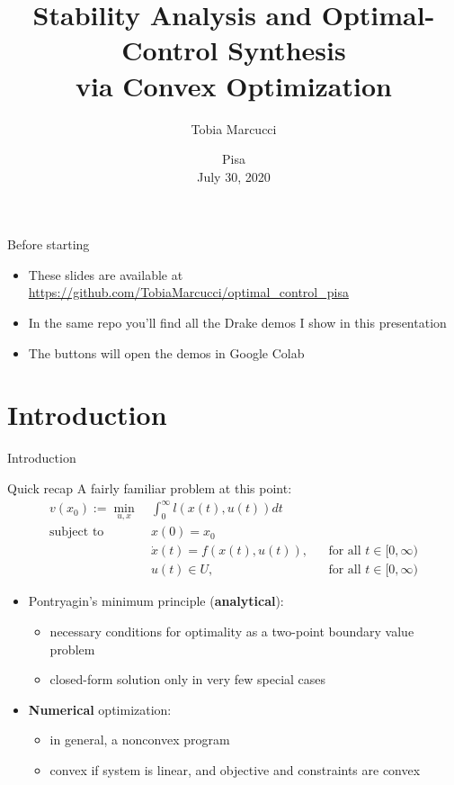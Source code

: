 \documentclass[aspectratio=169]{beamer}
\title[Stability and Control Synthesis via Convex Optimization]{Stability Analysis and Optimal-Control Synthesis \\ via Convex Optimization}
\author{Tobia Marcucci}
\institute{\textit{tobiam@mit.edu}}
\date{Pisa \\ July 30, 2020}
\begin{document}
\begin{frame}
\titlepage
\end{frame}

\begin{frame}{Before starting}
\begin{itemize}
\item
These slides are available at \href{https://github.com/TobiaMarcucci/optimal_control_pisa}{{\color{blue}https://github.com/TobiaMarcucci/optimal\_control\_pisa}}
\item
In the same repo you'll find all the Drake demos I show in this presentation
\item
The buttons  will open the demos in Google Colab
\end{itemize}
\end{frame}

\section{Introduction}
\begin{frame}
\huge
\centering
{\color{darkred} Introduction}
\end{frame}

\begin{frame}{Quick recap}
A fairly familiar problem at this point:
\begin{align*}
v(x_0) := \min_{u, x} \ &\int_0^\infty l(x(t), u(t)) dt \\
\text{subject to} \ & x(0) = x_0 \\
& \dot x(t) = f(x(t), u(t)), &&  \text{for all }t \in [0, \infty) \\
& u(t) \in U, &&  \text{for all }t \in [0, \infty)
\end{align*}
\pause
\vspace{-7mm}
\begin{itemize}
\item
Pontryagin's minimum principle (\textbf{analytical}):
\begin{itemize}
\item
necessary conditions for optimality as a two-point boundary value problem
\item
closed-form solution only in very few special cases
\end{itemize}
\item
\textbf{Numerical} optimization:
\begin{itemize}
\item
in general, a nonconvex program
\item
convex if system is linear, and objective and constraints are convex
\end{itemize}
\end{itemize}
\end{frame}
\end{document}
